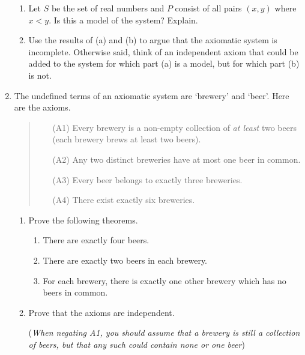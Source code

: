 \begin{exercises}{}{}
\begin{enumerate}
\begin{enumerate}
			\item Let $S$ be the set of real numbers and $P$ consist of all pairs $(x,y)$ where $x<y$. Is this a model of the system? Explain.
			
			\item Use the results of (a) and (b) to argue that the axiomatic system is incomplete. Otherwise said, think of an independent axiom that could be added to the system for which part (a) is a model, but for which part (b) is not.
		\end{enumerate}
		
		
		\item The undefined terms of an axiomatic system are `brewery' and `beer'. Here are the axioms.
	  \begin{quote}
		\begin{itemize}
	  	\item[(A1)] Every brewery is a non-empty collection of \emph{at least} two beers (each brewery brews at least two beers).
	  	\item[(A2)] Any two distinct breweries have at most one beer in common.
	  	\item[(A3)] Every beer belongs to exactly three breweries.
	  	\item[(A4)] There exist exactly six breweries.
		\end{itemize}
	  \end{quote}
	  
		\begin{enumerate}
		  \item Prove the following theorems.
		  \begin{enumerate}
		    \item There are exactly four beers.
		      
		    \item There are exactly two beers in each brewery.
		      
		    \item For each brewery, there is exactly one other brewery which has no beers in common.
		 \end{enumerate}
		  	
		 \item Prove that the axioms are independent.\par
		 (\emph{When negating A1, you should assume that a brewery is still a collection of beers, but that any such could contain none or one beer})
		\end{enumerate}
	  
	\end{enumerate}
\end{exercises}

